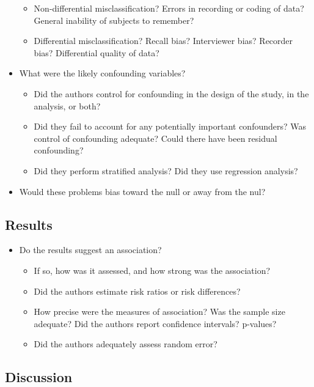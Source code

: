 \documentclass[
]{book}
\providecommand{\tightlist}{%
  \setlength{\itemsep}{0pt}\setlength{\parskip}{0pt}}
\begin{document}
\begin{itemize}
  \begin{itemize}
  \tightlist
  \item
    Non-differential misclassification? Errors in recording or coding of data? General inability of subjects to remember?
  \item
    Differential misclassification? Recall bias? Interviewer bias? Recorder bias? Differential quality of data?
  \end{itemize}
\item
  What were the likely confounding variables?

  \begin{itemize}
  \tightlist
  \item
    Did the authors control for confounding in the design of the study, in the analysis, or both?
  \item
    Did they fail to account for any potentially important confounders? Was control of confounding adequate? Could there have been residual confounding?
  \item
    Did they perform stratified analysis? Did they use regression analysis?
  \end{itemize}
\item
  Would these problems bias toward the null or away from the nul?
\end{itemize}

\hypertarget{results}{%
\subsection{Results}\label{results}}

\begin{itemize}
\tightlist
\item
  Do the results suggest an association?

  \begin{itemize}
  \tightlist
  \item
    If so, how was it assessed, and how strong was the association?
  \item
    Did the authors estimate risk ratios or risk differences?
  \item
    How precise were the measures of association? Was the sample size adequate? Did the authors report confidence intervals? p-values?
  \item
    Did the authors adequately assess random error?
  \end{itemize}
\end{itemize}

\hypertarget{discussion}{%
\subsection{Discussion}\label{discussion}}
\end{document}

